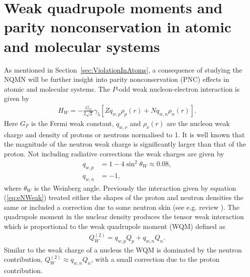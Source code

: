 \documentclass[10pt,a4paper, twoside, openright]{report}
\begin{document}
\section{Weak quadrupole moments and parity nonconservation in atomic and molecular systems\label{sec:PNC}} 
As mentioned in Section~\ref{sec:ViolationInAtoms}, a consequence of studying the NQMN will be further insight into parity nonconservation (PNC) effects in atomic and molecular systems. The $P$-odd weak nucleon-electron interaction is given by
\begin{align} \label{eq:eNWeak}
H_W = -\frac{G_F}{2\sqrt{2}}\gamma_{5}\left[Zq_{w, p}\rho_{p}(r) + Nq_{w, n}\rho_{n}(r)\right].
\end{align}
Here $G_F$ is the Fermi weak constant, $q_{w,\nu}$ and $\rho_{\nu}(r)$ are the nucleon weak charge  and density of protons or neutrons  normalised to 1. It is well known that the magnitude of the neutron weak charge is significantly larger than that of the proton. Not including radiative corrections the weak charges  are given by 
\begin{align*}
q_{w,p} &= 1 - 4\sin^2\theta_W \approx 0.08 ,\\
q_{w,n} &= -1,
\end{align*}
where $\theta_W$ is the Weinberg angle.  Previously the interaction given by equation (\ref{eq:eNWeak}) treated either the shapes of the proton and neutron densities  the same  or included a correction due to some neutron skin (see e.g. review \cite{Roberts2015}).  The quadrupole moment in the nuclear density produces the tensor weak interaction which is proportional to the weak quadrupole moment (WQM) defined as  \cite{FDC17}
\begin{align*}
Q_{W}^{(2)} = q_{w,p}Q_{p} + q_{w,n}Q_n.
\end{align*}
Similar to the weak charge of a nucleus the WQM is dominated by the neutron contribution,  $Q_{W}^{(2)} \approx q_{w,n}Q_n$,  with a small correction due to the proton contribution. \\
\end{document}
